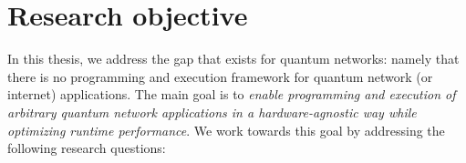 \section{Research objective}
In this thesis, we address the gap that exists for quantum networks: namely that there is no programming and execution framework for quantum network (or internet) applications.
The main goal is to \emph{enable programming and execution of arbitrary quantum network applications in a hardware-agnostic way while optimizing runtime performance}.
We work towards this goal by addressing the following research questions:


